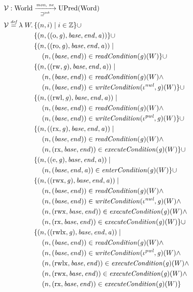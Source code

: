 \documentclass[compsoc,conference,letterpaper,fleqn]{IEEEtran}
\newcommand{\defeq}{\stackrel{\textit{\tiny{def}}}{=}}
\newcommand{\union}{\mathbin{\cup}}
\newcommand{\var}[1]{\mathit{#1}}
\newcommand{\gl}{\var{g}}
\newcommand{\addr}{\var{a}}
\newcommand{\start}{\var{base}}
\newcommand{\addrend}{\var{end}}
\newcommand{\perm}{\var{perm}}
\newcommand{\stdcap}[1][(\perm,\gl)]{\left(#1,\start,\addrend,\addr \right)}
\newcommand{\nwl}{\var{nwl}}
\newcommand{\pwl}{\var{pwl}}
\newcommand{\plainfun}[2]{
  \ifthenelse{\equal{#2}{}}
  {\mathit{#1}}
  {\mathit{#1}(#2)}
}
\newcommand{\readCond}[1]{\plainfun{readCondition}{#1}}
\newcommand{\writeCond}[1]{\plainfun{writeCondition}{#1}}
\newcommand{\execCond}[1]{\plainfun{executeCondition}{#1}}
\newcommand{\entryCond}[1]{\plainfun{enterCondition}{#1}}
\newcommand{\futurewk}{\mathbin{\sqsupseteq}^{\var{pub}}}
\newcommand{\monwknefun}{\xrightarrow[\text{\tiny{$\futurewk$}}]{\textit{\tiny{mon, ne}}}}
\newcommand{\asmType}{\plaindom{AsmType}}
\newcommand{\plaindom}[1]{\mathrm{#1}}
\newcommand{\Words}{\plaindom{Word}}
\newcommand{\ints}{\mathbb{Z}}
\newcommand{\Worlds}{\plaindom{World}}
\newcommand{\UPred}[1]{\plaindom{UPred}(#1)}
\newcommand{\intr}[2]{\mathcal{#1}}
\newcommand{\valueintr}[1]{\intr{V}{#1}}
\newcommand{\stdvr}{\valueintr{\asmType}}
\newcommand{\npair}[2][n]{\left(#1,#2 \right)}
\newcommand{\plainperm}[1]{\mathrm{#1}}
\newcommand{\noperm}{\plainperm{o}}
\newcommand{\readonly}{\plainperm{ro}}
\newcommand{\readwrite}{\plainperm{rw}}
\newcommand{\exec}{\plainperm{rx}}
\newcommand{\entry}{\plainperm{e}}
\newcommand{\rwx}{\plainperm{rwx}}
\newcommand{\readwritel}{\plainperm{rwl}}
\newcommand{\rwlx}{\plainperm{rwlx}}
\begin{document}
\begin{align*}
  &\stdvr : \Worlds \monwknefun \UPred{\Words} \\
  &\stdvr\defeq \lambda \; W \ldotp 
    \begin{aligned}[t]
      & \{ \npair{i} \mid i \in \ints \} 
      \union \\
      & \{ \npair{\stdcap[(\noperm,\gl)] }  \} 
      \union \\
      & \{ \npair{\stdcap[(\readonly,\gl)] } \mid \\
      & \quad \npair{(\start,\addrend)} \in \readCond{}(\gl)(W)\} 
      \union \\
      & \{ \npair{\stdcap[(\readwrite,\gl)] } \mid \\
      & \quad \npair{(\start,\addrend)} \in \readCond{}(\gl)(W) \land \\
      & \quad \npair{(\start,\addrend)} \in \writeCond{}(\iota^\nwl,\gl)(W) \}
      \union \\
      & \{ \npair{\stdcap[(\readwritel,\gl)] } \mid \\
      & \quad \npair{(\start,\addrend)} \in \readCond{}(\gl)(W) \land \\
      & \quad \npair{(\start,\addrend)} \in \writeCond{}(\iota^\pwl,\gl)(W) \}
      \union \\
      & \{ \npair{\stdcap[(\exec,\gl)]} \mid \\
      & \quad \npair{(\start,\addrend)} \in \readCond{}(\gl)(W) \land \\
      & \quad \npair{(\exec,\start,\addrend)} \in \execCond{}(\gl)(W) \} 
      \union \\
      & \{ \npair{\stdcap[(\entry,\gl)]} \mid \\
      & \quad \npair{(\start,\addrend,\addr)} \in \entryCond{}(\gl)(W)\} 
      \union \\
      & \{ \npair{\stdcap[(\rwx,\gl)]} \mid \\
      & \quad \npair{(\start,\addrend)} \in \readCond{}(\gl)(W) \land \\
      & \quad \npair{(\start,\addrend)} \in \writeCond{}(\iota^\nwl,\gl)(W) \land\\
      & \quad \npair{(\rwx,\start,\addrend)} \in \execCond{}(\gl)(W)  \land \\
      & \quad \npair{(\exec,\start,\addrend)} \in \execCond{}(\gl)(W) \}
      \union \\
      & \{ \npair{\stdcap[(\rwlx,\gl)]} \mid \\
      & \quad \npair{(\start,\addrend)} \in \readCond{}(\gl)(W) \land \\
      & \quad \npair{(\start,\addrend)} \in \writeCond{}(\iota^\pwl,\gl)(W) \land\\
      & \quad \npair{(\rwlx,\start,\addrend)} \in \execCond{}(\gl)(W) \land \\
      & \quad \npair{(\rwx,\start,\addrend)} \in \execCond{}(\gl)(W) \land \\
      & \quad \npair{(\exec,\start,\addrend)} \in \execCond{}(\gl)(W) \}
    \end{aligned}
\end{align*}
\end{document}
